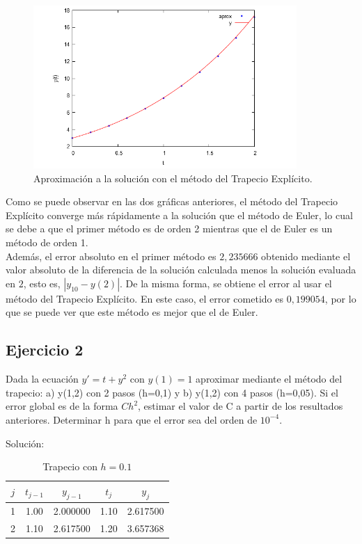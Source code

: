 \documentclass{article}
\theoremstyle{theorem-style}  %
\theoremstyle{definition-style}
\theoremstyle{example-style}
\begin{document}
	\begin{figure}[h]
		\centering
		\includegraphics[width=10cm]{./Images/ejtp1-2.png}
		\caption{Aproximación a la solución con el método del Trapecio Explícito.} 
		\label{fig:aprox2}
	\end{figure}

Como se puede observar en las dos gráficas anteriores, el método del Trapecio Explícito converge más rápidamente a la solución que el método de Euler, lo cual se debe a que el primer método es de orden 2 mientras que el de Euler es un método de orden 1.\\

Además, el error absoluto en el primer método es $2,235666$ obtenido mediante el valor absoluto de la diferencia de la solución calculada menos la solución evaluada en $2$, esto es, $|y_{10} - y(2)|$. De la misma forma, se obtiene el error al usar el método del Trapecio Explícito. En este caso, el error cometido es $0,199054$, por lo que se puede ver que este método es mejor que el de Euler.

\subsection{Ejercicio 2}
Dada la ecuación $y'=t+y^2$ con $y(1)=1$ aproximar mediante el método del trapecio: a) y(1,2) con 2 pasos (h=0,1) y b) y(1,2) con 4 pasos (h=0,05). Si el error global es de la forma $Ch^2$, estimar el valor de C a partir de los resultados anteriores. Determinar h para que el error sea del orden de $10^{-4}$.

Solución:

    \begin{table}[H]
		\centering
		\begin{tabular}{|| c | c | c | c | c ||}
			\hline
			\hline $j$ &  $t_{j-1}$ & $y_{j-1}$ & $t_j$ & $y_j$ \\
			\hline 1 & 1.00 & 2.000000 & 1.10 & 2.617500 \\
			\hline 2 & 1.10 & 2.617500 & 1.20 & 3.657368 \\
		\end{tabular}
		\caption{Trapecio con $h=0.1$}
		\label{table:trapecio-ej2}
	\end{table}
	
\end{document}
